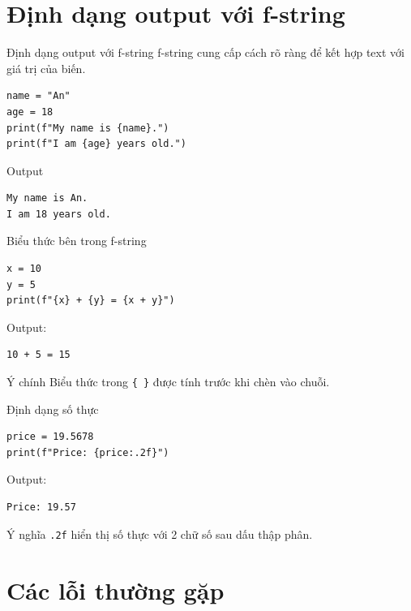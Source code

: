 \documentclass[aspectratio=169,10pt]{beamer}
\begin{document}
\section{Định dạng output với f-string}

\begin{frame}[fragile]{Định dạng output với f-string}
f-string cung cấp cách rõ ràng để kết hợp text với giá trị của biến.
\begin{lstlisting}
name = "An"
age = 18
print(f"My name is {name}.")
print(f"I am {age} years old.")
\end{lstlisting}
\begin{block}{Output}
\begin{verbatim}
My name is An.
I am 18 years old.
\end{verbatim}
\end{block}
\end{frame}

\begin{frame}[fragile]{Biểu thức bên trong f-string}
\begin{lstlisting}
x = 10
y = 5
print(f"{x} + {y} = {x + y}")
\end{lstlisting}
Output:
\begin{verbatim}
10 + 5 = 15
\end{verbatim}
\begin{alertblock}{Ý chính}
Biểu thức trong \texttt{\{ \}} được tính trước khi chèn vào chuỗi.
\end{alertblock}
\end{frame}

\begin{frame}[fragile]{Định dạng số thực}
\begin{lstlisting}
price = 19.5678
print(f"Price: {price:.2f}")
\end{lstlisting}
Output:
\begin{verbatim}
Price: 19.57
\end{verbatim}
\begin{block}{Ý nghĩa}
\texttt{.2f} hiển thị số thực với 2 chữ số sau dấu thập phân.
\end{block}
\end{frame}

\section{Các lỗi thường gặp}
\end{document}
